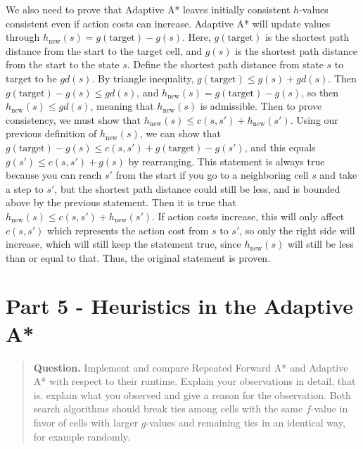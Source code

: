 \documentclass[11pt]{article}
\newcommand{\question}[1]{%
\begin{quote}
\textbf{Question.} #1
\end{quote}
}
\begin{document}
We also need to prove that Adaptive A* leaves initially consistent $h$-values consistent even if action costs can increase. Adaptive A* will update values through $h_{\text{new}}(s) = g(\text{target}) - g(s)$. Here, $g(\text{target})$ is the shortest path distance from the start to the target cell, and $g(s)$ is the shortest path distance from the start to the state $s$. Define the shortest path distance from state $s$ to target to be $gd(s)$. By triangle inequality, $g(\text{target}) \le g(s) + gd(s)$. Then $g(\text{target}) - g(s) \le gd(s)$, and $h_{\text{new}}(s) = g(\text{target}) - g(s)$, so then $h_{\text{new}}(s) \le gd(s)$, meaning that $h_{\text{new}}(s)$ is admissible. Then to prove consistency, we must show that $h_{\text{new}}(s) \le c(s, s') + h_{\text{new}}(s')$. Using our previous definition of $h_{\text{new}}(s)$, we can show that $g(\text{target}) - g(s) \le c(s, s') + g(\text{target}) - g(s')$, and this equals $g(s') \le c(s, s') + g(s)$ by rearranging. This statement is always true because you can reach $s'$ from the start if you go to a neighboring cell $s$ and take a step to $s'$, but the shortest path distance could still be less, and is bounded above by the previous statement. Then it is true that $h_{\text{new}}(s) \le c(s, s') + h_{\text{new}}(s')$. If action costs increase, this will only affect $c(s, s')$ which represents the action cost from $s$ to $s'$, so only the right side will increase, which will still keep the statement true, since $h_{\text{new}}(s)$ will still be less than or equal to that. Thus, the original statement is proven.

\section*{Part 5 - Heuristics in the Adaptive A* }
\question{Implement and compare Repeated Forward A* and Adaptive A* with respect to their runtime. Explain your observations in detail, that is, explain what you observed and give a reason for the observation. Both search algorithms should break ties among cells with the same \(f\)-value in favor of cells with larger \(g\)-values and remaining ties in an identical way, for example randomly.}
\end{document}
